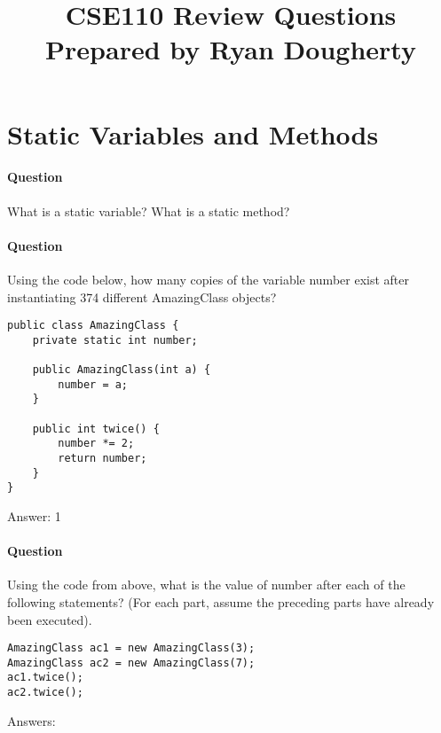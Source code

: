 \documentclass{article}
\date{}
\begin{document}
\title{\textbf{CSE110 Review Questions \\
Prepared by Ryan Dougherty}}
\maketitle

\section*{Static Variables and Methods}


\setcounter{question_num}{1}
\paragraph{Question }
What is a static variable? What is a static method?

\addtocounter{question_num}{1}
\paragraph{Question }
Using the code below, how many copies of the variable number exist after instantiating 374 different AmazingClass objects?
\begin{lstlisting}
public class AmazingClass {
	private static int number;

	public AmazingClass(int a) {
		number = a;
	}

	public int twice() {
		number *= 2;
		return number;
	}
}
\end{lstlisting}
{\color{red}Answer: 1}

\addtocounter{question_num}{1}
\paragraph{Question }
Using the code from above, what is the value of number after each of the following statements? (For each part, assume the preceding parts have already been executed).
\begin{lstlisting}
AmazingClass ac1 = new AmazingClass(3); 
AmazingClass ac2 = new AmazingClass(7);
ac1.twice();
ac2.twice();
\end{lstlisting}
{\color{red}Answers:
}
\end{document}
